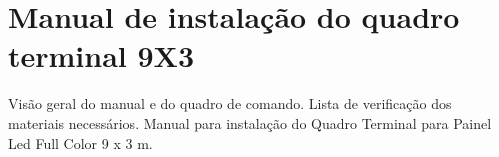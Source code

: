 %
\newcommand{\Linh}{9}
\newcommand{\Colun}{3}
%
%


\chapter{Manual de instalação do quadro terminal \Linh X\Colun}
Visão geral do manual e do quadro de comando. 
Lista de verificação dos materiais necessários.
Manual para instalação do Quadro Terminal para Painel Led Full Color 9 x 3 m.

